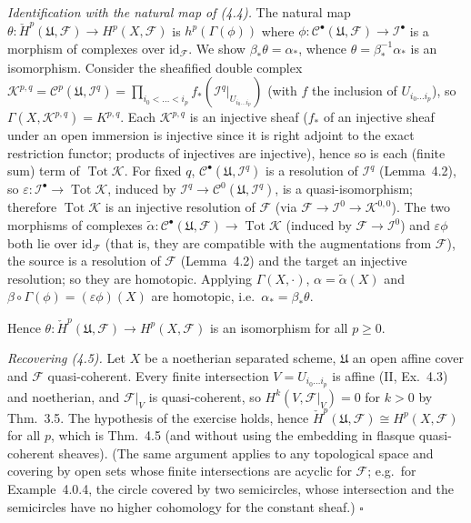 \documentclass[11pt]{article}
\begin{document}
\emph{Identification with the natural map of (4.4).} The natural map $\theta:\check H^p(\mathfrak U,\mathcal F)\to H^p(X,\mathcal F)$ is $h^p(\Gamma(\phi))$ where $\phi:\mathcal C^\bullet(\mathfrak U,\mathcal F)\to\mathcal I^\bullet$ is a morphism of complexes over $\mathrm{id}_{\mathcal F}$. We show $\beta_*\theta=\alpha_*$, whence $\theta=\beta_*^{-1}\alpha_*$ is an isomorphism. Consider the sheafified double complex $\mathcal K^{p,q}=\mathcal C^p(\mathfrak U,\mathcal I^q)=\prod_{i_0<\dots<i_p}f_*(\mathcal I^q|_{U_{i_0\dots i_p}})$ (with $f$ the inclusion of $U_{i_0\dots i_p}$), so $\Gamma(X,\mathcal K^{p,q})=K^{p,q}$. Each $\mathcal K^{p,q}$ is an injective sheaf ($f_*$ of an injective sheaf under an open immersion is injective since it is right adjoint to the exact restriction functor; products of injectives are injective), hence so is each (finite sum) term of $\operatorname{Tot}\mathcal K$. For fixed $q$, $\mathcal C^\bullet(\mathfrak U,\mathcal I^q)$ is a resolution of $\mathcal I^q$ (Lemma~4.2), so $\varepsilon:\mathcal I^\bullet\to\operatorname{Tot}\mathcal K$, induced by $\mathcal I^q\to\mathcal C^0(\mathfrak U,\mathcal I^q)$, is a quasi-isomorphism; therefore $\operatorname{Tot}\mathcal K$ is an injective resolution of $\mathcal F$ (via $\mathcal F\to\mathcal I^0\to\mathcal K^{0,0}$). The two morphisms of complexes $\tilde\alpha:\mathcal C^\bullet(\mathfrak U,\mathcal F)\to\operatorname{Tot}\mathcal K$ (induced by $\mathcal F\to\mathcal I^0$) and $\varepsilon\phi$ both lie over $\mathrm{id}_{\mathcal F}$ (that is, they are compatible with the augmentations from $\mathcal F$), the source is a resolution of $\mathcal F$ (Lemma~4.2) and the target an injective resolution; so they are homotopic. Applying $\Gamma(X,\cdot)$, $\alpha=\tilde\alpha(X)$ and $\beta\circ\Gamma(\phi)=(\varepsilon\phi)(X)$ are homotopic, i.e.\ $\alpha_*=\beta_*\theta$.

Hence $\theta:\check H^p(\mathfrak U,\mathcal F)\to H^p(X,\mathcal F)$ is an isomorphism for all $p\ge0$.

\emph{Recovering (4.5).} Let $X$ be a noetherian separated scheme, $\mathfrak U$ an open affine cover and $\mathcal F$ quasi-coherent. Every finite intersection $V=U_{i_0\dots i_p}$ is affine (II, Ex.~4.3) and noetherian, and $\mathcal F|_V$ is quasi-coherent, so $H^k(V,\mathcal F|_V)=0$ for $k>0$ by Thm.~3.5. The hypothesis of the exercise holds, hence $\check H^p(\mathfrak U,\mathcal F)\cong H^p(X,\mathcal F)$ for all $p$, which is Thm.~4.5 (and without using the embedding in flasque quasi-coherent sheaves). (The same argument applies to any topological space and covering by open sets whose finite intersections are acyclic for $\mathcal F$; e.g.\ for Example~4.0.4, the circle covered by two semicircles, whose intersection and the semicircles have no higher cohomology for the constant sheaf.) \hfill$\square$
\end{document}
